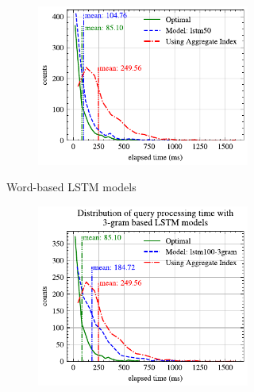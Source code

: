 \documentclass[conference]{IEEEtran}
\begin{document}
\begin{figure}[!th]
\begin{subfigure}{0.45\textwidth}
\begin{subfigure}{\textwidth}
			\includegraphics[]{graphics/perf_dist_lstm50_A.pdf}
		\end{subfigure}
		\caption{Word-based LSTM models}
	\end{subfigure}
	\hfill
	\begin{subfigure}{0.45\textwidth}
		\begin{subfigure}{\textwidth}
			\centering
			\includegraphics[]{graphics/perf_dist_lstm100_3gram_A.pdf}
		\end{subfigure}
		\vfill
		\begin{subfigure}{\textwidth}
			\centering

\end{subfigure}
\end{subfigure}
\end{figure}
\end{document}
